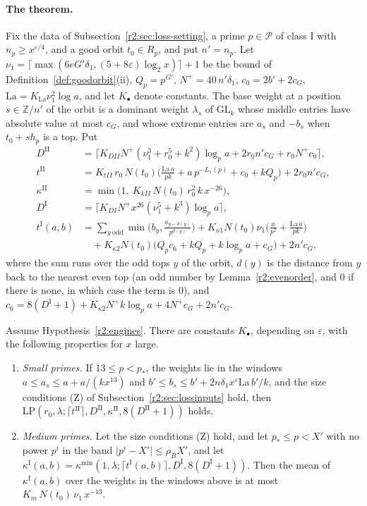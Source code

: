 \paragraph{The theorem.} Fix the data of Subsection~\ref{r2:sec:loss-setting}, a prime $p\in\mathcal P$ of class I with $n_p\ge x^{\varepsilon/4}$, and a good orbit $t_0\in R_p$, and put $n'=n_p$. Let $\nu_1=\lceil\max(6eG'\delta_1,(5+8\varepsilon)\log_2x)\rceil+1$ be the bound of Definition~\ref{def:goodorbit}(ii), $Q_p=p^{G'}$, $N^+=40\,n'\delta_1$, $c_0=2b'+2c_G$, $\mathrm{La}=K_{\mathrm{La}}\nu_1^2\log a$, and let $K_\bullet$ denote constants. The base weight at a position $s\in\mathbb Z/n'$ of the orbit is a dominant weight $\lambda_s$ of $\mathrm{GL}_k$ whose middle entries have absolute value at most $c_G$, and whose extreme entries are $a_s$ and $-b_s$ when $t_0+sh_p$ is a top. Put
\begin{align*}
D^{\mathrm{II}}&=\Big\lceil K_{DII}N^+(\nu_1^3+r_0^5+k^2)\log_pa+2r_0n'c_G+r_0N^+c_0\Big\rceil,\\
t^{\mathrm{II}}&=K_{tII}\,r_0\,N(t_0)\Big(\frac{\mathrm{La}\,a}{pk}+a\,p^{-L_1(p)}+c_0+kQ_p\Big)+2r_0n'c_G,\\
\kappa^{\mathrm{II}}&=\min\big(1,\ K_{kII}\,N(t_0)\,r_0^2\,k\,x^{-26}\big),\\
D^{\mathrm I}&=\Big\lceil K_{DI}N^+x^{26}(\nu_1^5+k^3)\log_pa\Big\rceil,\\
t^{\mathrm I}(a,b)&=\sum_{y\ \mathrm{odd}}\min\Big(b_y,\frac{a_{y-d(y)}}{p^{d(y)}}\Big)+K_{\kappa1}N(t_0)\nu_1\Big(\frac a{p^2}+\frac{\mathrm{La}\,a}{pk}\Big)\\ &\quad {}+K_{\kappa2}N(t_0)\big(Q_pc_6+kQ_p+k\log_pa+c_G\big)+2n'c_G,
\end{align*}
where the sum runs over the odd tops $y$ of the orbit, $d(y)$ is the distance from $y$ back to the nearest even top (an odd number by Lemma~\ref{r2:evenorder}, and $0$ if there is none, in which case the term is $0$), and $c_6=8(D^{\mathrm I}+1)+K_{\kappa2}N^+k\log_pa+4N^+c_G+2n'c_G$.

\begin{theorem}\label{r2:LPthm}
Assume Hypothesis~\ref{r2:engines}. There are constants $K_\bullet$, depending on $\varepsilon$, with the following properties for $x$ large.
\begin{enumerate}
\item[(i)] \emph{Small primes.} If $13\le p<p_*$, the weights lie in the windows $a\le a_s\le a+a/(kx^{13})$ and $b'\le b_s\le b'+2n\delta_1x^{\varepsilon}\mathrm{La}\,b'/k$, and the size conditions (Z) of Subsection~\ref{r2:sec:lossinputs} hold, then $\mathrm{LP}(r_0,\lambda;\lceil t^{\mathrm{II}}\rceil,D^{\mathrm{II}},\kappa^{\mathrm{II}},8(D^{\mathrm{II}}+1))$ holds.
\item[(ii)] \emph{Medium primes.} Let the size conditions (Z) hold, and let $p_*\le p<X'$ with no power $p^i$ in the band $\lvert p^i-X'\rvert\le\rho_BX'$, and let $\kappa^{\mathrm I}(a,b)=\kappa^{\min}(1,\lambda;\lceil t^{\mathrm I}(a,b)\rceil,D^{\mathrm I},8(D^{\mathrm I}+1))$. Then the mean of $\kappa^{\mathrm I}(a,b)$ over the weights in the windows above is at most $K_m\,N(t_0)\,\nu_1\,x^{-13}$.
\end{enumerate}
\end{theorem}

